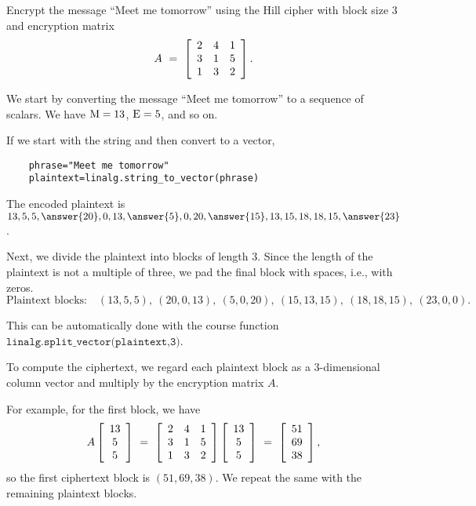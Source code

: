 \documentclass{ximera}
\begin{document}
\begin{example}\label{ex:hill-cipher-encryption}
  Encrypt the message ``Meet me tomorrow'' using the Hill cipher with
  block size $3$ and encryption matrix
  \begin{equation*}
    A ~=~ \startmat{ccc}
      2 & 4 & 1 \\
      3 & 1 & 5 \\
      1 & 3 & 2 \\
    \stopmat.
  \end{equation*}


\begin{solution}
  We start by converting the message ``Meet me tomorrow'' to a sequence
  of scalars. We have $\qq{M}=13$, $\qq{E}=5$, and so on. 
  
  If we start with the string and then convert to a vector,
  
  \begin{verbatim}
    phrase="Meet me tomorrow"
    plaintext=linalg.string_to_vector(phrase)
  \end{verbatim}
  
  The encoded
  plaintext is $13,5,5,\answer{20},0,13,\answer{5},0,20,\answer{15},13,15,18,18,15,\answer{23}$. 
  
  Next, we
  divide the plaintext into blocks of length 3. Since the length of
  the plaintext is not a multiple of three, we pad the final block
  with spaces, i.e., with zeros.
  \begin{equation*}
    \mbox{Plaintext blocks:}\quad
    (13,5,5),\
    (20,0,13),\
    (5,0,20),\
    (15,13,15),\
    (18,18,15),\
    (23,0,0).
  \end{equation*}

  This can be automatically done with the course function $\texttt{linalg.split\_vector(plaintext,3)}$.

  To compute the ciphertext, we regard each plaintext block as a
  $3$-dimensional column vector and multiply by the encryption matrix
  $A$. 
  
  For example, for the
  first block, we have
  \begin{equation*}
    A \startmat{c} 13 \\ 5 \\ 5 \stopmat
    ~=~ \startmat{ccc}
      2 & 4 & 1 \\
      3 & 1 & 5 \\
      1 & 3 & 2 \\
    \stopmat
    \startmat{c} 13 \\ 5 \\ 5 \stopmat
    ~=~ \startmat{c} 51 \\ 69 \\ 38  \stopmat,
  \end{equation*}
  so the first ciphertext block is $(51 ,69 ,38 )$. We repeat the same
  with the remaining plaintext blocks.


\end{solution}
\end{example}
\end{document}

